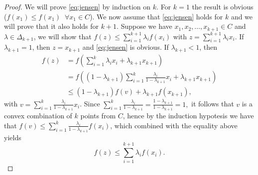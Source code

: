 \documentclass[10pt,a4paper]{article}
\begin{document}
\begin{proof}
	We will prove \eqref{eq:jensen} by induction on $k$. For $k=1$ the result is obvious ($f(x_1)\leq f(x_1)\;\;\forall x_1 \in C$). We now assume that \eqref{eq:jensen} holds for $k$ and we will prove that it also holds for $k+1$. Suppose we have $x_1, x_2, \dots, x_{k+1} \in C$ and $\lambda\in \Delta_{k+1}$, we will show that $f(z)\leq \sum_{i=1}^{k+1} \lambda_i f(x_i)$ with $z=\sum_{i=1}^{k+1} \lambda_i x_i$. If $\lambda_{k+1} =1$, then $z=x_{k+1}$ and \eqref{eq:jensen} is obvious. If $\lambda_{k+1}<1$, then
	\begin{equation*}
		\begin{split}
			f(z)& = f\left(\sum_{i=1}^k \lambda_i x_i + \lambda_{k+1}x_{k+1} \right)\\
			&= f\left((1-\lambda_{k+1})\sum_{i=1}^k \frac{\lambda_i}{1-\lambda_{k+1}} x_i + \lambda_{k+1}x_{k+1} \right)\\
			&\leq (1-\lambda_{k+1})f(v) + \lambda_{k+1} f(x_{k+1}),
		\end{split}
	\end{equation*}
with $v= \sum_{i=1}^k\frac{\lambda_i}{1-\lambda_{k+1}} x_i$. Since $\sum_{i=1}^k\frac{\lambda_i}{1-\lambda_{k+1}} = \frac{1-\lambda_{k+1}}{1-\lambda_{k+1}} = 1,$ it follows that $v$ is a convex combination of $k$ points from $C$, hence by the induction hypotesis we have that $f(v)\leq \sum_{i=1}^k\frac{\lambda_i}{1-\lambda_{k+1}} f(x_i)$, which combined with the equality above yields
\begin{equation*}
	f(z) \leq \sum_{i=1}^{k+1} \lambda_i f(x_i).
\end{equation*}
\end{proof}
\end{document}
